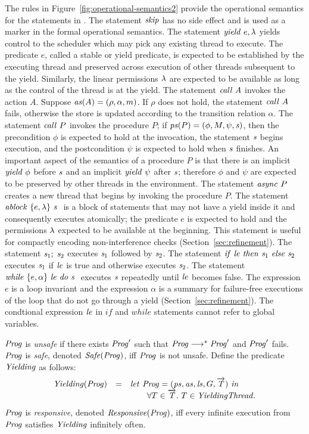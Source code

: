 The rules in Figure~\ref{fig:operational-semantics2} provide the operational semantics for the statements in \civl.
The statement $\mathit{skip}$ has no side effect and is used as a marker in the formal operational semantics.
The statement $\mathit{yield}\ e,\lambda$ yields control to the scheduler which may pick any existing thread to execute.
The predicate $e$, called a stable or yield predicate, is expected to be established by the executing thread and preserved across
execution of other threads subsequent to the yield.
Similarly, the linear permissions $\lambda$ are expected to be available as long as the control of the thread
is at the yield.
The statement $\mathit{call}\ A$ invokes the action $A$.
Suppose $\mathit{as}(A) = (\rho, \alpha, m)$.
If $\rho$ does not hold, the statement $\mathit{call}\ A$ fails, 
otherwise the store is updated according to the transition relation $\alpha$.
The statement $\mathit{call}\ P$ invokes the procedure $P$;
if $\mathit{ps}(P) = (\phi, M, \psi, \mathit{s})$, then the precondition $\phi$ is expected to hold at the invocation,
the statement $\mathit{s}$ begins execution, and the postcondition $\psi$ is expected to hold when $\mathit{s}$ finishes.
An important aspect of the semantics of a procedure $P$ is that there is an implicit $\mathit{yield}\ \phi$ before $\mathit{s}$
and an implicit $\mathit{yield}\ \psi$ after $\mathit{s}$; therefore $\phi$ and $\psi$ are expected to be preserved by other threads in the environment. 
The statement $\mathit{async}\ P$ creates a new thread that begins by invoking the procedure $P$.
The statement $\mathit{ablock}\ {\{e,\lambda\}}\ {\mathit{s}}\ $ is a block of statements that may not have a yield inside it and consequently executes atomically;
the predicate $e$ is expected to hold and the permissions $\lambda$ expected to be available at the beginning.
This statement is useful for compactly encoding non-interference checks (Section~\ref{sec:refinement}).
The statement $\mathit{s}_1;\;\mathit{s}_2$ executes $\mathit{s}_1$ followed by $\mathit{s}_2$.
The statement ${\mathit{if}\ {\mathit{le}}\ }{\mathit{then}\ {\mathit{s}_1}\ }{\mathit{else}\ {\mathit{s}_2}\ }$ executes $\mathit{s}_1$ if $\mathit{le}$ is true and otherwise executes $\mathit{s}_2$.
The statement $\mathit{while}\ \{{e,\alpha}\}\ {{\mathit{le}}\ } \mathit{do}\ {{\mathit{s}}\ }$ executes $\mathit{s}$ repeatedly until $\mathit{le}$ becomes false.
The expression $e$ is a loop invariant and the expression $\alpha$ is a summary for failure-free executions of the loop that do not go 
through a yield (Section~\ref{sec:refinement}).
The condtional expression $\mathit{le}$ in $\mathit{if}$ and $\mathit{while}$ statements cannot refer to global variables.

$\mathit{Prog}$ is {\em unsafe\/} if there exists $\mathit{Prog}'$ such that $\mathit{Prog} \longrightarrow^* \mathit{Prog}'$ and $\mathit{Prog}'$ fails.
$\mathit{Prog}$ is {\em safe}, denoted $\mathit{Safe}(\mathit{Prog})$, iff $\mathit{Prog}$ is not unsafe.
Define the predicate $\mathit{Yielding}$ as follows:
\[
\begin{array}{lcl}
\mathit{Yielding}(\mathit{Prog}) & = & \mathit{let}\ \mathit{Prog} = (\mathit{ps}, \mathit{as}, \mathit{ls}, G, \overrightarrow{\mathit{T}})\ \mathit{in}\\
                 &   & ~~~~~~\forall T \in \overrightarrow{\mathit{T}}.\ T \in \mathit{YieldingThread}.
\end{array}
\]
$\mathit{Prog}$ is {\em responsive\/}, denoted $\mathit{Responsive}(\mathit{Prog})$, iff every infinite execution from $\mathit{Prog}$ satisfies $\mathit{Yielding}$ infinitely often.

